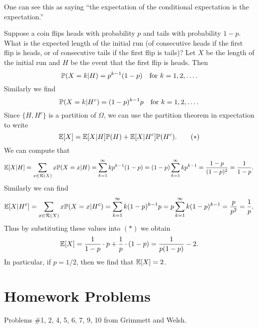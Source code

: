 \begin{remark}
  One can see this as saying
  ``the expectation of the conditional expectation
  is the expectation.''
\end{remark}

\begin{example}
  Suppose a coin flips heads with probability $p$
  and tails with probability $1 - p$. What is the
  expected length of the initial run (of consecutive
  heads if
  the first flip is heads, or of consecutive
  tails if the first flip is tails)? Let $X$ be the
  length of the initial run and $H$ be the event that
  the first flip is heads. Then
  \[
    \mathbb{P}(X = k | H) = p^{k - 1}(1 - p)
    \quad \text{for $k = 1, 2, \dots$.}
  \]
  Similarly we find
  \[
    \mathbb{P}(X = k | H^c) = (1 - p)^{k - 1}p
    \quad \text{for $k = 1, 2, \dots$.}
  \]
  Since $\{H, H^c\}$ is a partition of $\Omega$,
  we can use the partition theorem in expectation
  to write
  \[
    \mathbb{E}[X] = \mathbb{E}[X | H] \mathbb{P}(H) + \mathbb{E}[X | H^c] \mathbb{P}(H^c). \tag{$*$}
  \]
  We can compute that
  \[
    \mathbb{E}[X | H] = \sum_{x \in \mathcal{R}(X)} x \mathbb{P}(X = x | H)
    = \sum_{k = 1}^\infty k p^{k - 1}(1 - p)
    = (1 - p) \sum_{k = 1}^\infty k p^{k - 1}
    = \frac{1 - p}{(1 - p)^2} = \frac{1}{1 - p}.
  \]
  Similarly we can find
  \[
    \mathbb{E}[X | H^c] = \sum_{x \in \mathcal{R}(X)} x \mathbb{P}(X = x | H^c)
    = \sum_{k = 1}^\infty k (1 - p)^{k - 1}p
    = p \sum_{k = 1}^\infty k (1 - p)^{k - 1}
    = \frac{p}{p^2} = \frac{1}{p}.
  \]
  Thus by substituting these values into $(*)$ we
  obtain
  \[
    \mathbb{E}[X] = \frac{1}{1 - p} \cdot p + \frac{1}{p} \cdot (1 - p)
    = \frac{1}{p(1 - p)} - 2.
  \]
  In particular, if $p = 1 / 2$, then we find that
  $\mathbb{E}[X] = 2$.
\end{example}

\section{Homework Problems}
Problems \#1, 2, 4, 5, 6, 7, 9, 10 from Grimmett and Welsh.
